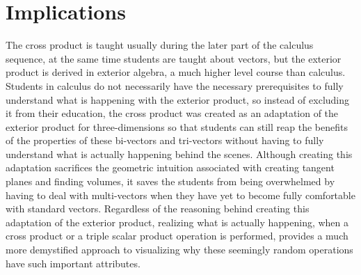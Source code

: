 \documentclass{amsart}
\begin{document}
	\section{Implications} \label{implications}
		The cross product is taught usually during the later part of the calculus sequence, at the same time students are taught about vectors, but the exterior product is derived in exterior algebra, a much higher level course than calculus. Students in calculus do not necessarily have the necessary prerequisites to fully understand what is happening with the exterior product, so instead of excluding it from their education, the cross product was created as an adaptation of the exterior product for three-dimensions so that students can still reap the benefits of the properties of these bi-vectors and tri-vectors without having to fully understand what is actually happening behind the scenes. Although creating this adaptation sacrifices the geometric intuition associated with creating tangent planes and finding volumes, it saves the students from being overwhelmed by having to deal with multi-vectors when they have yet to become fully comfortable with standard vectors. Regardless of the reasoning behind creating this adaptation of the exterior product, realizing what is actually happening, when a cross product or a triple scalar product operation is performed, provides a much more demystified approach to visualizing why these seemingly random operations have such important attributes.
\end{document}
